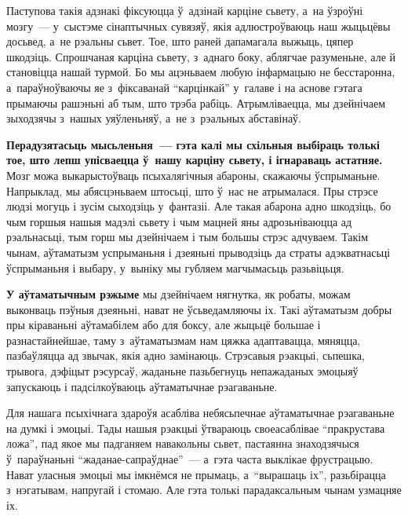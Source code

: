 
Паступова такія адзнакі фіксуюцца ў~адзінай карціне сьвету, а~на ўзроўні мозгу~--- у~сыстэме сінаптычных сувязяў, якія адлюстроўваюць наш жыцьцёвы досьвед, а~не рэальны сьвет. Тое, што раней дапамагала выжыць, цяпер шкодзіць. Спрошчаная карціна сьвету, з~аднаго боку, аблягчае разуменьне, але й становіцца нашай турмой. Бо мы ацэньваем любую інфармацыю не бесстаронна, а~параўноўваючы яе з~фіксаванай ``карцінкай'' у~галаве і на аснове гэтага прымаючы рашэньні аб тым, што трэба рабіць. Атрымліваецца, мы дзейнічаем зыходзячы з~нашых уяўленьняў, а~не з~рэальных абставінаў.

\textbf{Перадузятасьць мысьленьня~--- гэта калі мы схільныя выбіраць толькі тое, што лепш упісваецца ў~нашу карціну сьвету, і ігнараваць астатняе.} Мозг можа выкарыстоўваць псыхалягічныя абароны, скажаючы ўспрыманьне. Напрыклад, мы абясцэньваем штосьці, што ў~нас не атрымалася. Пры стрэсе людзі могуць і зусім сыходзіць у~фантазіі. Але такая абарона адно шкодзіць, бо чым горшыя нашыя мадэлі сьвету і чым мацней яны адрозьніваюцца ад рэальнасьці, тым горш мы дзейнічаем і тым большы стрэс адчуваем. Такім чынам, аўтаматызм успрыманьня і дзеяньні прыводзіць да страты адэкватнасьці ўспрыманьня і выбару, у~выніку мы губляем магчымасьць разьвіцьця.

\textbf{У аўтаматычным рэжыме} мы дзейнічаем нягнутка, як робаты, можам выконваць пэўныя дзеяньні, нават не ўсьведамляючы іх. Такі аўтаматызм добры пры кіраваньні аўтамабілем або для боксу, але жыцьцё большае і разнастайнейшае, таму з~аўтаматызмам нам цяжка адаптавацца, мяняцца, пазбаўляцца ад звычак, якія адно замінаюць. Стрэсавыя рэакцыі, сьпешка, трывога, дэфіцыт рэсурсаў, жаданьне пазьбегнуць непажаданых эмоцыяў запускаюць і падсілкоўваюць аўтаматычнае рэагаваньне.

Для нашага псыхічнага здароўя асабліва небясьпечнае аўтаматычнае рэагаваньне на думкі і эмоцыі. Тады нашыя рэакцыі ўтвараюць своеасаблівае ``пракрустава ложа'', пад якое мы падганяем навакольны сьвет, пастаянна знаходзячыся ў~параўнаньні ``жаданае-сапраўднае''~--- а~гэта часта выклікае фрустрацыю. Нават уласныя эмоцыі мы імкнёмся не прымаць, а~``вырашаць іх'', разьбірацца з~нэгатывам, напругай і стомаю. Але гэта толькі парадаксальным чынам узмацняе іх.


